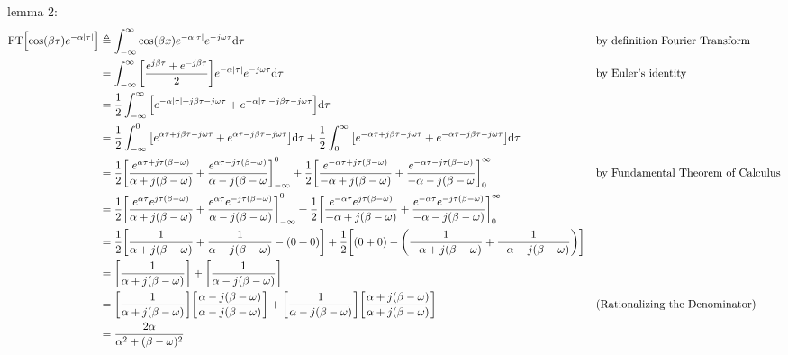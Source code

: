 lemma 2:
\begin{align*}
  \mathrm{FT}{\left[\cos(\beta\tau)e^{-\alpha{\left\lvert \tau \right\rvert}}\right]}
    &\triangleq \int_{-\infty}^{\infty} \cos(\beta x)e^{-\alpha{\left\lvert \tau \right\rvert}} e^{-j\omega\tau}\mathrm{d\tau}
    && \text{by definition Fourier Transform}
  \\&= \int_{-\infty}^{\infty} {\left[\frac{e^{j\beta\tau}+e^{-j\beta\tau}}{2}\right]} e^{-\alpha{\left\lvert \tau \right\rvert}} e^{-j\omega\tau}\mathrm{d\tau}
    &&  \text{by Euler's identity}
  \\&= \frac{1}{2}\int_{-\infty}^{\infty} {\left[e^{-\alpha{\left\lvert \tau \right\rvert}+j\beta\tau-j\omega\tau}+e^{-\alpha{\left\lvert \tau \right\rvert}-j\beta\tau-j\omega\tau}\right]} \mathrm{d\tau}
  \\&= \frac{1}{2}\int_{-\infty}^{0} {\left[e^{ \alpha\tau +j\beta\tau-j\omega\tau}+e^{ \alpha\tau -j\beta\tau-j\omega\tau}\right]} \mathrm{d\tau}
     + \frac{1}{2}\int_{0}^{\infty}  {\left[e^{-\alpha\tau +j\beta\tau-j\omega\tau}+e^{-\alpha\tau -j\beta\tau-j\omega\tau}\right]} \mathrm{d\tau}
  \\&= \frac{1}{2} {\left[\frac{e^{ \alpha\tau +j\tau(\beta-\omega)}}{ \alpha +j(\beta-\omega)} + \frac{e^{ \alpha\tau -j\tau(\beta-\omega)}}{ \alpha -j(\beta-\omega}\right]}_{-\infty}^{0}
     + \frac{1}{2} {\left[\frac{e^{-\alpha\tau +j\tau(\beta-\omega)}}{-\alpha +j(\beta-\omega)} + \frac{e^{-\alpha\tau -j\tau(\beta-\omega)}}{-\alpha -j(\beta-\omega}\right]}_{0}^{\infty} 
    && \text{by Fundamental Theorem of Calculus}
  \\&= \frac{1}{2} {\left[\frac{e^{ \alpha\tau} e^{j\tau(\beta-\omega)}}{ \alpha +j(\beta-\omega)} + \frac{e^{ \alpha\tau} e^{-j\tau(\beta-\omega)}}{ \alpha -j(\beta-\omega)}\right]}_{-\infty}^{0}
     + \frac{1}{2} {\left[\frac{e^{-\alpha\tau} e^{j\tau(\beta-\omega)}}{-\alpha +j(\beta-\omega)} + \frac{e^{-\alpha\tau} e^{-j\tau(\beta-\omega)}}{-\alpha -j(\beta-\omega)}\right]}_{0}^{\infty} 
  \\&= \frac{1}{2} {\left[\frac{1}{ \alpha +j(\beta-\omega)} + \frac{1}{ \alpha -j(\beta-\omega)} - (0+0)\right]}
     + \frac{1}{2} {\left[(0+0)-{\left(\frac{1}{-\alpha +j(\beta-\omega)} + \frac{1}{-\alpha -j(\beta-\omega)}\right)}\right]}
  \\&= {\left[\frac{1}{ \alpha +j(\beta-\omega)}\right]} 
     + {\left[\frac{1}{ \alpha -j(\beta-\omega)}\right]} 
  \\&= {\left[\frac{1}{ \alpha +j(\beta-\omega)}\right]} {\left[\frac{ \alpha -j(\beta-\omega)}{ \alpha -j(\beta-\omega)}\right]}
     + {\left[\frac{1}{ \alpha -j(\beta-\omega)}\right]} {\left[\frac{ \alpha +j(\beta-\omega)}{ \alpha +j(\beta-\omega)}\right]}
    && \text{(Rationalizing the Denominator)}
  \\&= \frac{2\alpha}{\alpha^2+(\beta-\omega)^2}
\end{align*}

